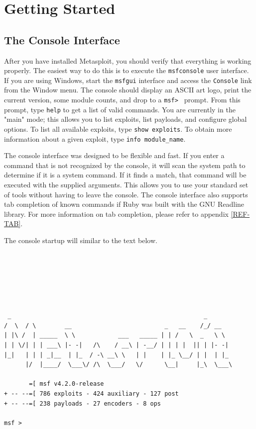 \documentclass{report}
\begin{document}
\pagebreak

\chapter{Getting Started}

    \section{The Console Interface}
    \label{STARTED-CONSOLE}

\par
After you have installed Metasploit, you should verify that everything is
working properly. The easiest way to do this is to execute the
\texttt{msfconsole} user interface. If you are using Windows, start the
\texttt{msfgui} interface and access the \texttt{Console} link from the Window
menu. The console should display an ASCII art logo, print the current version,
some module counts, and drop to a \texttt{msf> } prompt. From this prompt, type
\texttt{help} to get a list of valid commands. You are currently in the "main"
mode; this allows you to list exploits, list payloads, and configure global
options. To list all available exploits, type \texttt{show exploits}. To obtain
more information about a given exploit, type \texttt{info module\_name}.

\par
The console interface was designed to be flexible and fast. If you enter a
command that is not recognized by the console, it will scan the system path to
determine if it is a system command. If it finds a match, that command will be
executed with the supplied arguments. This allows you to use your standard set
of tools without having to leave the console. The console interface also
supports tab completion of known commands if Ruby was built with the GNU
Readline library. For more information on tab completion, please refer to
appendix \ref{REF-TAB}.

\par
The console startup will similar to the text below.

\begin{verbatim}






 _                                                      _
/  \  / \        __                          _   __    /_/ __
| |\ /  | _____  \ \            ___   _____ | | /   \  _   \ \
| | \/| | | ___\ |- -|   /\    / __\ | -__/ | | | |  || | |- -|
|_|   | | | _|__  | |_  / -\ __\ \   | |    | |_ \__/ | |  | |_
      |/  |____/  \___\/ /\  \___/   \/      \__|     |_\  \___\

       =[ msf v4.2.0-release
+ -- --=[ 786 exploits - 424 auxiliary - 127 post
+ -- --=[ 238 payloads - 27 encoders - 8 ops

msf >
\end{verbatim}
\end{document}
